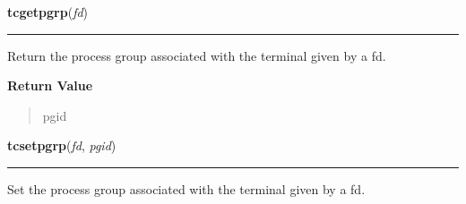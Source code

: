    \label{os:tcgetpgrp}

    \vspace{0.5ex}

\hspace{.8\funcindent}\begin{boxedminipage}{\funcwidth}

    \raggedright \textbf{tcgetpgrp}(\textit{fd})

    \vspace{-1.5ex}

    \rule{\textwidth}{0.5\fboxrule}
\setlength{\parskip}{2ex}
    Return the process group associated with the terminal given by a fd.

\setlength{\parskip}{1ex}
      \textbf{Return Value}
    \vspace{-1ex}

      \begin{quote}
      pgid

      \end{quote}

    \end{boxedminipage}

    \label{os:tcsetpgrp}

    \vspace{0.5ex}

\hspace{.8\funcindent}\begin{boxedminipage}{\funcwidth}

    \raggedright \textbf{tcsetpgrp}(\textit{fd}, \textit{pgid})

    \vspace{-1.5ex}

    \rule{\textwidth}{0.5\fboxrule}
\setlength{\parskip}{2ex}
    Set the process group associated with the terminal given by a fd.

\setlength{\parskip}{1ex}
    \end{boxedminipage}

    \label{os:tempnam}

    \vspace{0.5ex}

